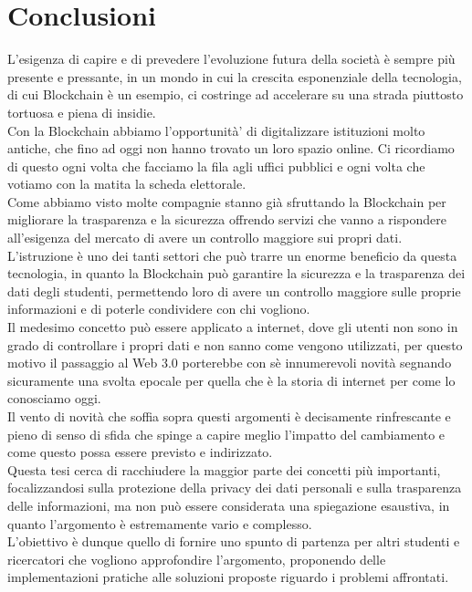 \chapter{Conclusioni}
L'esigenza di capire e di prevedere l'evoluzione futura della società è sempre più presente e pressante,
in un mondo in cui la crescita esponenziale della tecnologia, di cui Blockchain è un esempio, ci costringe ad accelerare su una strada piuttosto tortuosa e piena di insidie.
\\Con la Blockchain abbiamo l'opportunità' di digitalizzare istituzioni molto antiche, che fino ad oggi non hanno trovato un loro spazio online.
Ci ricordiamo di questo ogni volta che facciamo la fila agli uffici pubblici e ogni volta che votiamo con la matita la scheda elettorale.
\\Come abbiamo visto molte compagnie stanno già sfruttando la Blockchain per migliorare la trasparenza e la sicurezza offrendo servizi che vanno a rispondere all'esigenza del mercato di avere un controllo maggiore sui propri dati.
\\L'istruzione è uno dei tanti settori che può trarre un enorme beneficio da questa tecnologia, in quanto la Blockchain può garantire la sicurezza e la trasparenza dei dati degli studenti, permettendo loro di avere un controllo maggiore sulle proprie informazioni e di poterle condividere con chi vogliono.
\\Il medesimo concetto può essere applicato a internet, dove gli utenti non sono in grado di controllare i propri dati e non sanno come vengono utilizzati, per questo motivo il passaggio al Web 3.0 porterebbe con sè innumerevoli novità segnando sicuramente una svolta epocale per quella che è la storia di internet per come lo conosciamo oggi.
\\Il vento di novità che soffia sopra questi argomenti è decisamente rinfrescante e pieno di senso di sfida che spinge a capire meglio l'impatto del cambiamento e come questo possa essere previsto e indirizzato.
\\Questa tesi cerca di racchiudere la maggior parte dei concetti più importanti, focalizzandosi sulla protezione della privacy dei dati personali e sulla trasparenza delle informazioni,
ma non può essere considerata una spiegazione esaustiva, in quanto l'argomento è estremamente vario e complesso. 
\\L'obiettivo è dunque quello di fornire uno spunto di partenza per altri studenti e ricercatori che vogliono approfondire l'argomento, proponendo delle implementazioni pratiche alle soluzioni proposte riguardo i problemi affrontati.